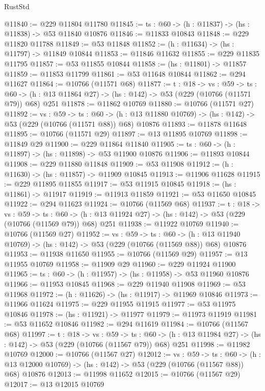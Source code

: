 \begin{lexlean}{RustStd}
\begin{coremodule}
@11840 := @229 @11804 @11780
@11845 := {ts : @60} -> (h : @11837) -> (hs : @11838) -> @53 @11840 @10876
@11846 := @11833 @10843
@11848 := @229 @11820 @11788
@11849 := @53 @11848
@11852 := (h : @11634) -> (hs : @11797) -> @11849 @10844
@11853 := @11846 @11632
@11855 := @229 @11835 @11795
@11857 := @53 @11855 @10844
@11858 := (hs : @11801) -> @11857
@11859 := @11853 @11799
@11861 := @53 @11648 @10844
@11862 := @294 @11627
@11864 := @10766 (@11571 @68)
@11877 := {t : @18} ->
  {vs : @59} ->
  {ts : @60} -> (h : @13 @11864 @27) -> (hs : @142) -> @53 (@229 (@10766 (@11571 @79)) @68) @251
@11878 := @11862 @10769
@11880 := @10766 (@11571 @27)
@11892 := {vs : @59} ->
  {ts : @60} ->
  (h : @13 @11880 @10769) -> (hs : @142) -> @53 (@229 (@10766 (@11571 @88)) @68) @10876
@11893 := @11878 @11648
@11895 := @10766 (@11571 @29)
@11897 := @13 @11895 @10769
@11898 := @11849 @29
@11900 := @229 @11864 @11840
@11905 := {ts : @60} -> (h : @11897) -> (hs : @11898) -> @53 @11900 @10876
@11906 := @11893 @10844
@11908 := @229 @11880 @11848
@11909 := @53 @11908
@11912 := (h : @11630) -> (hs : @11857) -> @11909 @10845
@11913 := @11906 @11628
@11915 := @229 @11895 @11855
@11917 := @53 @11915 @10845
@11918 := (hs : @11861) -> @11917
@11919 := @11913 @11859
@11921 := @53 @11650 @10845
@11922 := @294 @11623
@11924 := @10766 (@11569 @68)
@11937 := {t : @18} ->
  {vs : @59} ->
  {ts : @60} -> (h : @13 @11924 @27) -> (hs : @142) -> @53 (@229 (@10766 (@11569 @79)) @68) @251
@11938 := @11922 @10769
@11940 := @10766 (@11569 @27)
@11952 := {vs : @59} ->
  {ts : @60} ->
  (h : @13 @11940 @10769) -> (hs : @142) -> @53 (@229 (@10766 (@11569 @88)) @68) @10876
@11953 := @11938 @11650
@11955 := @10766 (@11569 @29)
@11957 := @13 @11955 @10769
@11958 := @11909 @29
@11960 := @229 @11924 @11900
@11965 := {ts : @60} -> (h : @11957) -> (hs : @11958) -> @53 @11960 @10876
@11966 := @11953 @10845
@11968 := @229 @11940 @11908
@11969 := @53 @11968
@11972 := (h : @11626) -> (hs : @11917) -> @11969 @10846
@11973 := @11966 @11624
@11975 := @229 @11955 @11915
@11977 := @53 @11975 @10846
@11978 := (hs : @11921) -> @11977
@11979 := @11973 @11919
@11981 := @53 @11652 @10846
@11982 := @294 @11619
@11984 := @10766 (@11567 @68)
@11997 := {t : @18} ->
  {vs : @59} ->
  {ts : @60} -> (h : @13 @11984 @27) -> (hs : @142) -> @53 (@229 (@10766 (@11567 @79)) @68) @251
@11998 := @11982 @10769
@12000 := @10766 (@11567 @27)
@12012 := {vs : @59} ->
  {ts : @60} ->
  (h : @13 @12000 @10769) -> (hs : @142) -> @53 (@229 (@10766 (@11567 @88)) @68) @10876
@12013 := @11998 @11652
@12015 := @10766 (@11567 @29)
@12017 := @13 @12015 @10769

\end{coremodule}
\end{lexlean}

